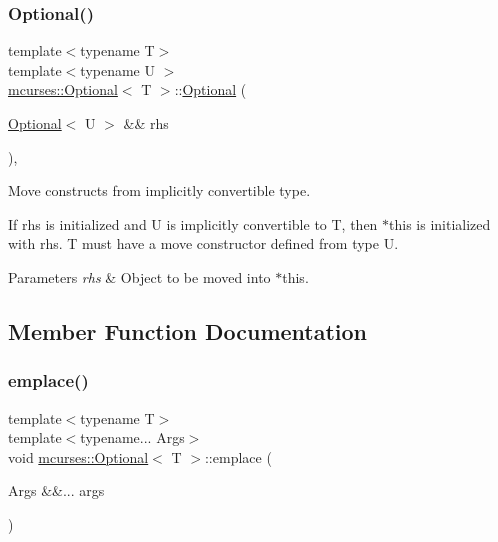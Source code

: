 \subsubsection{\texorpdfstring{Optional()}{Optional()}\hspace{0.1cm}{\footnotesize\ttfamily [10/10]}}
{\footnotesize\ttfamily template$<$typename T$>$ \\
template$<$typename U $>$ \\
\hyperlink{classmcurses_1_1Optional}{mcurses\+::\+Optional}$<$ T $>$\+::\hyperlink{classmcurses_1_1Optional}{Optional} (\begin{DoxyParamCaption}\item[{\hyperlink{classmcurses_1_1Optional}{Optional}$<$ U $>$ \&\&}]{rhs }\end{DoxyParamCaption})\hspace{0.3cm}{\ttfamily [inline]}, {\ttfamily [explicit]}}



Move constructs from implicitly convertible type. 

If {\ttfamily rhs} is initialized and U is implicitly convertible to T, then $\ast$this is initialized with {\ttfamily rhs}. T must have a move constructor defined from type U. 
\begin{DoxyParams}{Parameters}
{\em rhs} & Object to be moved into $\ast$this. \\
\hline
\end{DoxyParams}


\subsection{Member Function Documentation}
\hypertarget{classmcurses_1_1Optional_ad61d5e9b20d4824e064f528772e9b805}{}\label{classmcurses_1_1Optional_ad61d5e9b20d4824e064f528772e9b805} 
\subsubsection{\texorpdfstring{emplace()}{emplace()}}
{\footnotesize\ttfamily template$<$typename T$>$ \\
template$<$typename... Args$>$ \\
void \hyperlink{classmcurses_1_1Optional}{mcurses\+::\+Optional}$<$ T $>$\+::emplace (\begin{DoxyParamCaption}\item[{Args \&\&...}]{args }\end{DoxyParamCaption})\hspace{0.3cm}{\ttfamily [inline]}}



